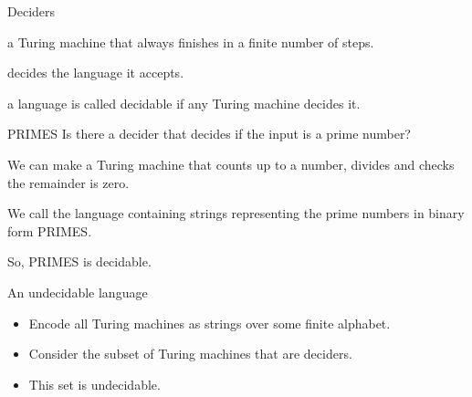 \begin{frame}{Deciders}
  \vspace{2mm}
  \begin{description}
    \setlength\itemsep{6mm}
    \item[Decider:] a Turing machine that always finishes in a finite number of steps.
    \item[Decides:] decides the language it accepts.
    \item[Decidable:] a language is called decidable if any Turing machine decides it.
  \end{description}
  \vspace{2mm}
\end{frame}



\begin{frame}{PRIMES}
  Is there a decider that decides if the input is a prime number?


  We can make a Turing machine that counts up to a number, divides and checks the remainder is zero.

  \vspace{2mm}

  We call the language containing strings representing the prime numbers in binary form PRIMES.


  So, PRIMES is decidable.
\end{frame}



\begin{frame}{An undecidable language}
  
  \begin{itemize}
    \setlength\itemsep{6mm}
    \item Encode all Turing machines as strings over some finite alphabet.
    \item Consider the subset of Turing machines that are deciders.
    \item This set is undecidable.
  \end{itemize}

\end{frame}